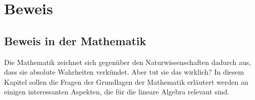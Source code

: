 %
%
%
\part{Beweis}

\chapter*{Beweis in der Mathematik}
Die Mathematik zeichnet sich gegenüber den Naturwissenschaften dadurch
aus, dass sie absolute Wahrheiten verkündet. 
Aber tut sie das wirklich?
In diesem Kapitel sollen die Fragen der Grundlagen der Mathematik
erläutert werden an einigen interessanten Aspekten, die für die lineare
Algebra relevant sind.


